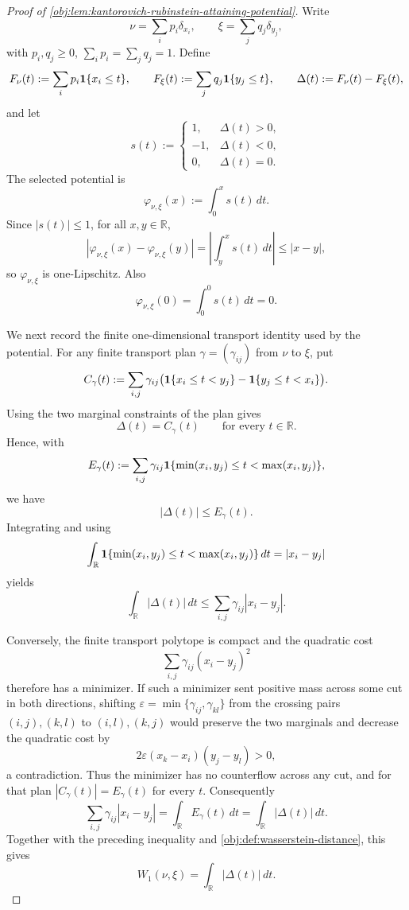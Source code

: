 \begin{proof}[Proof of \cref{obj:lem:kantorovich-rubinstein-attaining-potential}]
Write
\[
\nu=\sum_i p_i\delta_{x_i},
\qquad
\xi=\sum_j q_j\delta_{y_j},
\]
with \(p_i,q_j\ge0\), \(\sum_i p_i=\sum_jq_j=1\).  Define
\[
F_\nu(t):=\sum_i p_i{\bf 1}\{x_i\le t\},
\qquad
F_\xi(t):=\sum_j q_j{\bf 1}\{y_j\le t\},
\qquad
\Delta(t):=F_\nu(t)-F_\xi(t),
\]
and let
\[
s(t):=
\begin{cases}
1,&\Delta(t)>0,\\
-1,&\Delta(t)<0,\\
0,&\Delta(t)=0.
\end{cases}
\]
The selected potential is
\[
\varphi_{\nu,\xi}(x):=\int_0^x s(t)\,dt .
\]
Since \(|s(t)|\le1\), for all \(x,y\in\mathbb R\),
\[
|\varphi_{\nu,\xi}(x)-\varphi_{\nu,\xi}(y)|
=
\left|\int_y^x s(t)\,dt\right|
\le |x-y|,
\]
so \(\varphi_{\nu,\xi}\) is one-Lipschitz.  Also
\[
\varphi_{\nu,\xi}(0)=\int_0^0 s(t)\,dt=0 .
\]

We next record the finite one-dimensional transport identity used by the potential.  For any finite transport plan \(\gamma=(\gamma_{ij})\) from \(\nu\) to \(\xi\), put
\[
C_\gamma(t)
:=
\sum_{i,j}\gamma_{ij}
\bigl(
{\bf 1}\{x_i\le t<y_j\}
-
{\bf 1}\{y_j\le t<x_i\}
\bigr).
\]
Using the two marginal constraints of the plan gives
\[
\Delta(t)=C_\gamma(t)
\qquad\text{for every }t\in\mathbb R .
\]
Hence, with
\[
E_\gamma(t):=
\sum_{i,j}\gamma_{ij}
{\bf 1}\{\min(x_i,y_j)\le t<\max(x_i,y_j)\},
\]
we have
\[
|\Delta(t)|\le E_\gamma(t).
\]
Integrating and using
\[
\int_{\mathbb R}{\bf 1}\{\min(x_i,y_j)\le t<\max(x_i,y_j)\}\,dt
=
|x_i-y_j|
\]
yields
\[
\int_{\mathbb R}|\Delta(t)|\,dt
\le
\sum_{i,j}\gamma_{ij}|x_i-y_j|.
\]

Conversely, the finite transport polytope is compact and the quadratic cost
\[
\sum_{i,j}\gamma_{ij}(x_i-y_j)^2
\]
therefore has a minimizer.  If such a minimizer sent positive mass across some cut in both directions, shifting
\(\varepsilon=\min\{\gamma_{ij},\gamma_{kl}\}\) from the crossing pairs \((i,j),(k,l)\) to \((i,l),(k,j)\) would preserve the two marginals and decrease the quadratic cost by
\[
2\varepsilon(x_k-x_i)(y_j-y_l)>0,
\]
a contradiction.  Thus the minimizer has no counterflow across any cut, and for that plan \(|C_\gamma(t)|=E_\gamma(t)\) for every \(t\).  Consequently
\[
\sum_{i,j}\gamma_{ij}|x_i-y_j|
=
\int_{\mathbb R}E_\gamma(t)\,dt
=
\int_{\mathbb R}|\Delta(t)|\,dt .
\]
Together with the preceding inequality and \cref{obj:def:wasserstein-distance}, this gives
\[
W_1(\nu,\xi)=\int_{\mathbb R}|\Delta(t)|\,dt .
\]


\end{proof}
